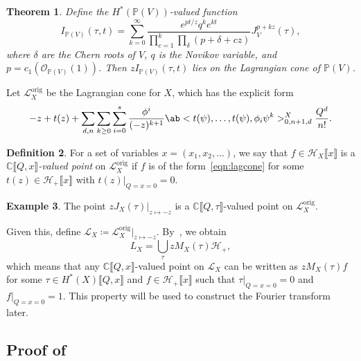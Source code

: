 \documentclass[leqno, openany]{memoir}
\newtheorem{thm}{Theorem}[section]
\theoremstyle{definition}
\newtheorem{defn}[thm]{Definition}
\newtheorem{exm}[thm]{Example}
\theoremstyle{remark}
\theoremstyle{plain}
\theoremstyle{definition}
\theoremstyle{remark}
\newcommand{\C}{\mathbb{C}}
\renewcommand{\P}{\mathbb{P}}
\newcommand{\mc}[1]{\mathcal{#1}}
\newcommand{\mr}[1]{\mathrm{#1}}
\begin{document}
\begin{thm}\label{thm:projbundlemirror}
    Define the $H^*(\P(V))$-valued function
    \[ I_{\P(V)}(\tau, t) = \sum_{k=0}^{\infty} \frac{e^{pt/z} q^k e^{kt}}{\prod_{c=1}^k \prod_{\delta} (p+\delta  + cz)} J_V^{p+kz}(\tau), \]
    where $\delta$ are the Chern roots of $V$, $q$ is the Novikov variable, and $p = c_1(\mc{O}_{\P(V)}(1))$. Then $z I_{\P(V)}(\tau, t)$ lies on the Lagrangian cone of $\P(V)$.
\end{thm}

Let $\mc{L}_X^{\mr{orig}}$ be the Lagrangian cone for $X$, which has the explicit form
\begin{equation}\label{eqn:lagcone}
    -z + t(z) + \sum_{d,n} \sum_{k\geq 0} \sum_{i=0}^s \frac{\phi^i}{(-z)^{k+1}} \ab<t(\psi), \ldots, t(\psi), \phi_i \psi^k>_{0,n+1,d}^X \frac{Q^d}{n!}. 
\end{equation}

\begin{defn}
    For a set of variables $x = (x_1, x_2, \ldots)$, we say that $f \in \mc{H}_X \llbracket x \rrbracket$ is a \textit{$\C\llbracket Q,x \rrbracket$-valued point} on $\mc{L}_X^{\mr{orig}}$ if $f$ is of the form~\ref{eqn:lagcone} for some $t(z) \in \mc{H}_+ \llbracket x \rrbracket$ with $t(z)|_{Q=x=0} = 0$.
\end{defn}

\begin{exm}
    The point $z J_X(\tau)|_{z \mapsto -z}$ is a $\C\llbracket Q,\tau \rrbracket$-valued point on $\mc{L}_X^{\mr{orig}}$.
\end{exm}

Given this, define $\mc{L}_X \coloneqq \mc{L}_X^{\mr{orig}}|_{z \mapsto -z}$. By~, we obtain
\[ L_X = \bigcup_{\tau} z M_X(\tau) \mc{H}_+, \]
which means that any $\C\llbracket Q,x \rrbracket$-valued point on $\mc{L}_X$ can be written as $z M_X(\tau) f$ for some $\tau \in H^*(X) \llbracket Q,x \rrbracket$ and $f \in \mc{H}_+ \llbracket x \rrbracket$ such that $\tau |_{Q=x=0} = 0$ and $f |_{Q=x=0} = 1$. This property will be used to construct the Fourier transform later.

\subsection{Proof of~}%
\label{sub:Proof of the mirror theorem}
\end{document}

